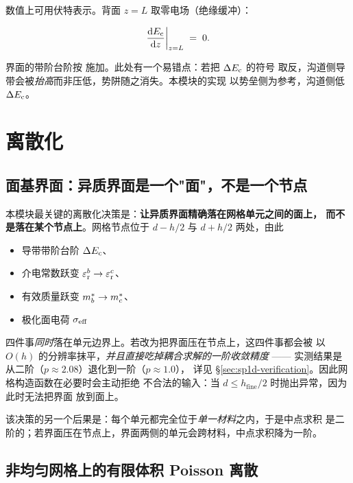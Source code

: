 数值上可用伏特表示。背面 $z=L$ 取零电场（绝缘缓冲）：

\begin{equation}
\frac{\mathrm{d} E_{\mathrm{c}}}{\mathrm{d} z}\bigg|_{z=L} \;=\; 0.
\label{eq:bc-back}
\end{equation}

界面的带阶台阶按  施加。此处有一个易错点：若把 $\Delta E_{\mathrm{c}}$ 的符号
取反，沟道侧导带会被\emph{抬高}而非压低，势阱随之消失。本模块的实现
以势垒侧为参考，沟道侧低 $\Delta E_{\mathrm{c}}$。

\section{离散化}
\label{sec:sp1d-discretisation}

\subsection{面基界面：异质界面是一个"面"，不是一个节点}
\label{sec:sp1d-face}

本模块最关键的离散化决策是：\textbf{让异质界面精确落在网格单元之间的面上，
而不是落在某个节点上}。网格节点位于 $d-h/2$ 与 $d+h/2$ 两处，由此

\begin{itemize}[leftmargin=1.7em,itemsep=0.25em,topsep=0.3em]
  \item 导带带阶台阶 $\Delta E_{\mathrm{c}}$、
  \item 介电常数跃变 $\varepsilon_{\mathrm{r}}^{b}\to\varepsilon_{\mathrm{r}}^{c}$、
  \item 有效质量跃变 $m^{*}_{b}\to m^{*}_{c}$、
  \item 极化面电荷 $\sigma_{\mathrm{eff}}$
\end{itemize}

\noindent
四件事\emph{同时}落在单元边界上。若改为把界面压在节点上，这四件事都会被
以 $O(h)$ 的分辨率抹平，\emph{并且直接吃掉耦合求解的一阶收敛精度} ——
实测结果是从二阶（$p\approx2.08$）退化到一阶（$p\approx1.0$），
详见 \S\ref{sec:sp1d-verification}。因此网格构造函数在必要时会主动拒绝
不合法的输入：当 $d\le h_{\text{fine}}/2$ 时抛出异常，因为此时无法把界面
放到面上。

该决策的另一个后果是：每个单元都完全位于\emph{单一材料}之内，于是中点求积
是二阶的；若界面压在节点上，界面两侧的单元会跨材料，中点求积降为一阶。

\subsection{非均匀网格上的有限体积 Poisson 离散}
\label{sec:sp1d-fv}

